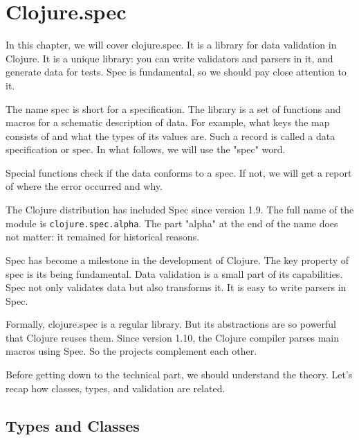 \chapter{Clojure.spec}

\label{chapter-spec}


\begin{teaser}
In this chapter, we will cover clojure.spec. It is a library for data validation in Clojure. It is a unique library: you can write validators and parsers in it, and generate data for tests. Spec is fundamental, so we should pay close attention to it.
\end{teaser}

The name spec is short for a specification. The library is a set of functions and macros for a schematic description of data. For example, what keys the map consists of and what the types of its values are. Such a record is called a data specification or spec. In what follows, we will use the "spec" word.

Special functions check if the data conforms to a spec. If not, we will get a report of where the error occurred and why.


The Clojure distribution has included Spec since version 1.9. The full name of the module is \verb|clojure.spec.alpha|. The part "alpha" at the end of the name does not matter: it remained for historical reasons.


Spec has become a milestone in the development of Clojure. The key property of spec is its being fundamental. Data validation is a small part of its capabilities. Spec not only validates data but also transforms it. It is easy to write parsers in Spec.

Formally, clojure.spec is a regular library. But its abstractions are so powerful that Clojure reuses them. Since version 1.10, the Clojure compiler parses main macros using Spec. So the projects complement each other.

Before getting down to the technical part, we should understand the theory. Let's recap how classes, types, and validation are related.

\section{Types and Classes}

